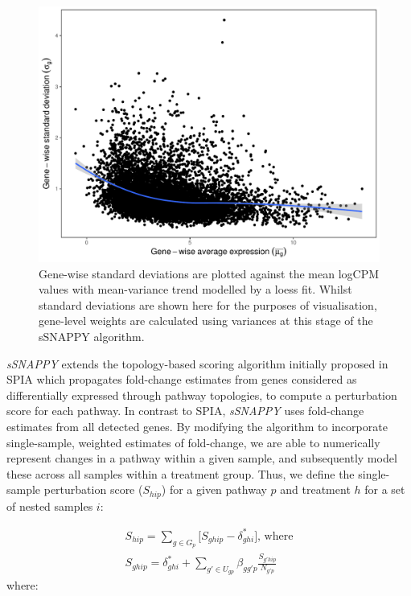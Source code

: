 \documentclass[9pt,a4paper,]{extarticle}
\begin{document}
\begin{figure}

{\centering \includegraphics[width=1\linewidth]{sSNAPPY_paper_files/figure-latex/Figure2} 

}

\caption{Gene-wise standard deviations are plotted against the mean logCPM values with mean-variance trend modelled by a loess fit. Whilst standard deviations are shown here for the purposes of visualisation, gene-level weights are calculated using variances at this stage of the sSNAPPY algorithm.}\label{fig:Figure2}
\end{figure}

\emph{sSNAPPY} extends the topology-based scoring algorithm initially proposed in SPIA\citep{Tarca2009} which propagates fold-change estimates from genes considered as differentially expressed through pathway topologies, to compute a perturbation score for each pathway.
In contrast to SPIA, \emph{sSNAPPY} uses fold-change estimates from all detected genes.
By modifying the algorithm to incorporate single-sample, weighted estimates of fold-change, we are able to numerically represent changes in a pathway within a given sample, and subsequently model these across all samples within a treatment group.
Thus, we define the single-sample perturbation score (\(S_{hip}\)) for a given pathway \(p\) and treatment \(h\) for a set of nested samples \(i\):

\[
\begin{aligned}
S_{hip} = \sum_{g \in G_p} \lbrack S_{ghip} - \delta_{ghi}^*\rbrack \text{, where} \\
S_{ghip} = \delta_{ghi}^* + \sum_{g' \in U_{gp}} \beta_{gg'p} \frac{S_{g'hip}}{N_{g'p}} 
\end{aligned}
\]
where:
\end{document}
